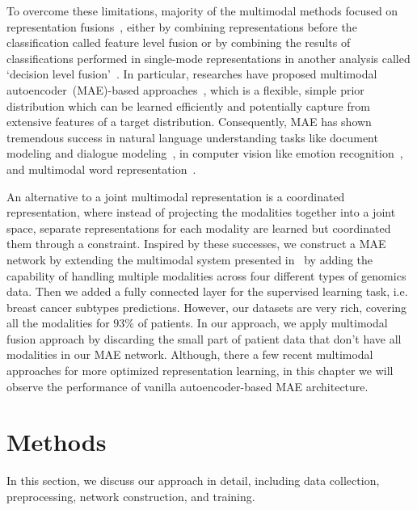 \hspace*{3.5mm} To overcome these limitations, majority of the multimodal methods focused on representation fusions~\cite{ito2018effects}, either by combining representations before the classification called feature level fusion or by combining the results of classifications performed in single-mode representations in another analysis  called `decision level fusion'~\cite{atrey2010multimodal}. In particular, researches have proposed multimodal autoencoder~(MAE)-based approaches~\cite{liu2016multimodal,serban2016multi,wang2018associativemulti}, which is a flexible, simple prior distribution which can be learned efficiently and potentially capture from extensive features of a target distribution. Consequently, MAE has shown tremendous success in natural language understanding tasks like document modeling and dialogue modeling~\cite{serban2016multi}, in computer vision like emotion recognition~\cite{liu2016multimodal}, and multimodal word representation~\cite{wang2018associativemulti}. 

\hspace*{3.5mm} An alternative to a joint multimodal representation is a coordinated representation, where instead of projecting the modalities together into a joint space, separate representations for each modality are learned but coordinated them through a constraint. Inspired by these successes, we construct a MAE network by extending the multimodal system presented in~\cite{wang2018associativemulti} by adding the capability of handling multiple modalities across four different types of genomics data. Then we added a fully connected layer for the supervised learning task, i.e. breast cancer subtypes predictions. However, our datasets are very rich, covering all the modalities for $93\%$ of patients. In our approach, we apply multimodal fusion approach by discarding the small part of patient data that don't have all modalities in our MAE network. Although, there a few recent multimodal approaches for more optimized representation learning, in this chapter we will observe the performance of vanilla autoencoder-based MAE architecture. 

\section{Methods}\label{chapter_4:mm}
In this section, we discuss our approach in detail, including data collection, preprocessing, network construction, and training. 

